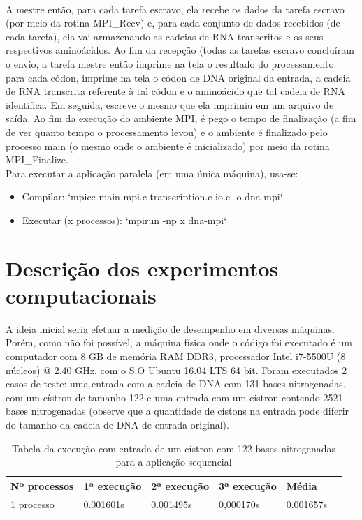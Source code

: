 \documentclass[a4paper,10pt]{article}
\begin{document}
\paragraph{} A mestre então, para cada tarefa escravo, ela recebe os dados da tarefa escravo (por meio da rotina MPI\_Recv) e, para cada conjunto de dados recebidos (de cada tarefa), ela vai armazenando as cadeias de RNA transcritos e os seus respectivos aminoácidos. Ao fim da recepção (todas as tarefas escravo concluíram o envio, a tarefa mestre então imprime na tela o resultado do processamento: para cada códon, imprime na tela o códon de DNA original da entrada, a cadeia de RNA transcrita referente à tal códon e o aminoácido que tal cadeia de RNA identifica. Em seguida, escreve o mesmo que ela imprimiu em um arquivo de saída. Ao fim da execução do ambiente MPI, é pego o tempo de finalização (a fim de ver quanto tempo o processamento levou) e o ambiente é finalizado pelo processo main (o mesmo onde o ambiente é inicializado) por meio da rotina MPI\_Finalize.\\

Para executar a aplicação paralela (em uma única máquina), usa-se:\\
\begin{center}\begin{itemize}\item{Compilar:} `mpicc main-mpi.c transcription.c io.c -o dna-mpi`\\
                     \item{Executar (x processos):} `mpirun -np x dna-mpi`\end{itemize}\end{center}


\section{Descrição dos experimentos computacionais}
A ideia inicial seria efetuar a medição de desempenho em diversas máquinas. Porém, como não foi possível, a máquina física onde o código foi executado é um computador com 8 GB de memória RAM DDR3, processador Intel i7-5500U (8 núcleos) @ 2.40 GHz, com o S.O Ubuntu 16.04 LTS 64 bit.  Foram executados 2 casos de teste: uma entrada com a cadeia de DNA com 131 bases nitrogenadas, com um cístron de tamanho 122 e uma entrada com  um cístron contendo 2521 bases nitrogenadas
(observe que a quantidade de cístons na entrada pode diferir do tamanho da cadeia de DNA de entrada original).

\begin{table}[!htb]
\begin{tabular}{| l | l | l | l | l | p{5cm} |} 
\hline
  Nº processos & 1ª execução & 2ª execução & 3ª execução & Média\\ \hline
1 processo   &	0.001601s   &   0.001495s   & 0,000170s   &  0.001657s\\ \hline

\end{tabular}
\caption{Tabela da execução com entrada de um cístron com 122 bases nitrogenadas para a aplicação sequencial}
\end{table}
\end{document}
